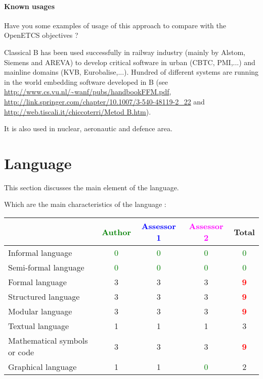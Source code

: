 \paragraph{Known usages} Have you some examples of usage of this approach to  compare with the OpenETCS objectives ?

\begin{author_comment}

Classical B has been used successfully  in railway  industry (mainly by Alstom, Siemens and AREVA) to  develop critical software in urban (CBTC, PMI,...) and mainline domains (KVB, Eurobalise,...). Hundred of different systems are running in the world embedding software developed in B (see \url{http://www.cs.vu.nl/~wanf/pubs/handbookFFM.pdf}, \url{http://link.springer.com/chapter/10.1007/3-540-48119-2_22} and \url{http://web.tiscali.it/chiccoterri/Metod B.htm}).

It is also used in nuclear, aeronautic and defence area.

\end{author_comment}


\section{Language}
This section discusses the main element of the language.

Which are the main characteristics of the language :

\begin{tabular}{|l | c | c | c | c|}
\hline
& \textcolor{green}{Author} & \textcolor{blue}{Assessor 1} & \textcolor{magenta}{Assessor 2} & Total \\
\hline 
Informal language & \textcolor{green}{0} & \textcolor{green}{0} & \textcolor{green}{0} & \textcolor{green}{0} \\
\hline 
Semi-formal language & \textcolor{green}{0} & \textcolor{green}{0} & \textcolor{green}{0} & \textcolor{green}{0} \\
\hline
Formal language & 3    & 3    & 3    & \textcolor{red}{\textbf{9}} \\
\hline
Structured language & 3    & 3    & 3    & \textcolor{red}{\textbf{9}} \\
\hline
Modular language & 3    & 3    & 3    & \textcolor{red}{\textbf{9}} \\
\hline
Textual language & 1    & 1    & 1    & 3    \\
\hline
Mathematical symbols or code & 3    & 3    & 3    & \textcolor{red}{\textbf{9}} \\
\hline
Graphical language & 1    & 1    & \textcolor{green}{0} & 2    \\
\hline
\end{tabular}

